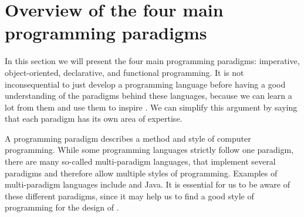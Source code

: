 \section{Overview of the four main programming paradigms}
\label{sec:paradigms}

In this section we will present the four main programming paradigms:
imperative, object-oriented, declarative, and functional programming.
It is not inconsequential to just develop a programming language
before having a good understanding of the paradigms behind these
languages, because we can learn a lot from them and use them to inspire
\productname{}. We can simplify this argument by saying that each
paradigm has its own area of expertise.

A programming paradigm describes a method and style of computer programming.
While some programming languages strictly follow one paradigm, there are many
so-called multi-paradigm languages, that implement several paradigms and
therefore allow multiple styles of programming. Examples of multi-paradigm
languages include \CS{} and Java. It is essential for us to be aware of these
different paradigms, since it may help us to find a good style of programming
for the design of \productname{}.

